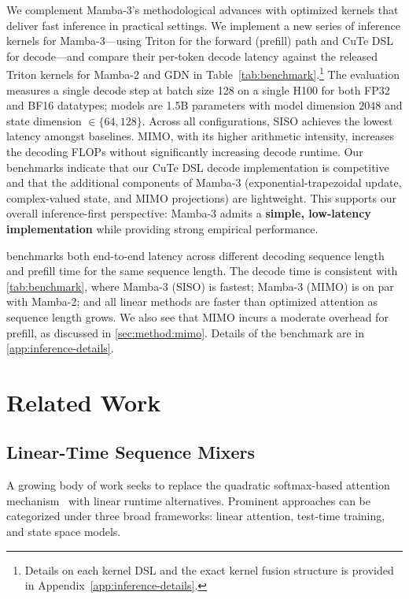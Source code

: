 \documentclass{article}
\newcommand{\citep}{\parencite}
\theoremstyle{plain}
\theoremstyle{definition}
\theoremstyle{remark}
\begin{document}
We complement Mamba-3's methodological advances with optimized kernels that deliver fast inference in practical settings.
We implement a new series of inference kernels for Mamba-3---using Triton for the forward (prefill) path and CuTe DSL for decode---and compare their per-token decode latency against the released Triton kernels for Mamba-2 and GDN in Table~\ref{tab:benchmark}.\footnote{Details on each kernel DSL and the exact kernel fusion structure is provided in Appendix~\ref{app:inference-details}.}
The evaluation measures a single decode step at batch size 128 on a single H100 for both FP32 and BF16 datatypes; models are 1.5B parameters with model dimension $2048$ and state dimension $\in \{64, 128\}$.
Across all configurations, SISO achieves the lowest latency amongst baselines.
MIMO, with its higher arithmetic intensity, increases the decoding FLOPs without significantly increasing decode runtime.
Our benchmarks indicate that our CuTe DSL decode implementation is competitive and that the additional components of Mamba-3 (exponential-trapezoidal update, complex-valued state, and MIMO projections) are lightweight.
This supports our overall inference-first perspective: Mamba-3 admits a \textbf{simple, low-latency implementation} while providing strong empirical performance.

 benchmarks both end-to-end latency across different decoding sequence length and prefill time for the same sequence length.
The decode time is consistent with \cref{tab:benchmark}, where Mamba-3 (SISO) is fastest; Mamba-3 (MIMO) is on par with Mamba-2; and all linear methods are faster than optimized attention as sequence length grows.
We also see that MIMO incurs a moderate overhead for prefill, as discussed in \cref{sec:method:mimo}.
Details of the benchmark are in \cref{app:inference-details}.

\section{Related Work}
\label{sec:related}

\subsection{Linear-Time Sequence Mixers} 
\label{sec:related:linear}

A growing body of work seeks to replace the quadratic softmax-based attention mechanism~\citep{vaswani2017attention,bahdanau2016neuralmachinetranslationjointly} with linear runtime alternatives.
Prominent approaches can be categorized under three broad frameworks: linear attention, test-time training, and state space models. 
\end{document}
